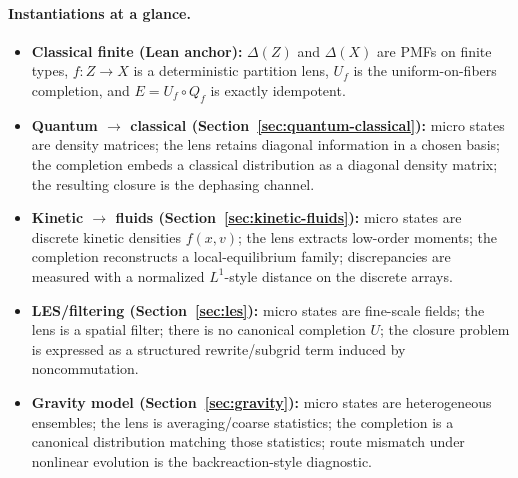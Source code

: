 \documentclass[11pt]{article}
\providecommand{\Z}{Z}
\providecommand{\X}{X}
\providecommand{\Dist}[1]{\Delta(#1)}
\providecommand{\Lens}{f}
\providecommand{\Qf}{Q_f}
\providecommand{\Uf}{U_f}
\begin{document}
\paragraph{Instantiations at a glance.}
\begin{itemize}
  \item \textbf{Classical finite (Lean anchor):} $\Dist{\Z}$ and $\Dist{\X}$ are PMFs on finite types, $\Lens:\Z\to\X$ is a deterministic partition lens, $\Uf$ is the uniform-on-fibers completion, and $E=\Uf\circ\Qf$ is exactly idempotent.

  \item \textbf{Quantum $\to$ classical (Section~\ref{sec:quantum-classical}):} micro states are density matrices; the lens retains diagonal information in a chosen basis; the completion embeds a classical distribution as a diagonal density matrix; the resulting closure is the dephasing channel.

  \item \textbf{Kinetic $\to$ fluids (Section~\ref{sec:kinetic-fluids}):} micro states are discrete kinetic densities $f(x,v)$; the lens extracts low-order moments; the completion reconstructs a local-equilibrium family; discrepancies are measured with a normalized $L^1$-style distance on the discrete arrays.

  \item \textbf{LES/filtering (Section~\ref{sec:les}):} micro states are fine-scale fields; the lens is a spatial filter; there is no canonical completion $U$; the closure problem is expressed as a structured rewrite/subgrid term induced by noncommutation.

  \item \textbf{Gravity model (Section~\ref{sec:gravity}):} micro states are heterogeneous ensembles; the lens is averaging/coarse statistics; the completion is a canonical distribution matching those statistics; route mismatch under nonlinear evolution is the backreaction-style diagnostic.
\end{itemize}
\end{document}
